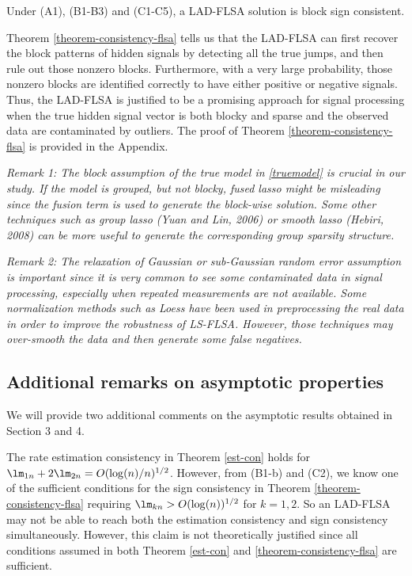 \documentclass[12pt]{article}
\begin{document}
\begin{theorem}\label{theorem-consistency-flsa}
Under (A1), (B1-B3) and (C1-C5), a LAD-FLSA solution is  block  sign consistent.
\end{theorem}
 Theorem \ref{theorem-consistency-flsa} tells us that
 the LAD-FLSA can first recover the block patterns of hidden signals  by detecting all the true jumps,
 and then rule out those nonzero blocks.
 Furthermore, with a very large probability, those nonzero blocks
 are identified correctly
  to have either positive or negative
 signals.
Thus, the LAD-FLSA is justified to be  a promising approach for signal processing
when the true hidden signal vector  is both blocky and sparse and the observed data are contaminated by outliers.
The proof of Theorem \ref{theorem-consistency-flsa} is
provided in the Appendix.


{\it Remark 1: The block assumption of the true model in \eqref{truemodel} is  crucial in our
study. If the model is grouped, but not blocky,  fused lasso might be misleading since the
 fusion term is used to generate the block-wise solution.
 Some other techniques such as group lasso (Yuan and Lin, 2006)
 or smooth lasso (Hebiri, 2008) can be more useful to generate the
 corresponding group sparsity structure.}


{\it Remark 2: The relaxation of Gaussian or sub-Gaussian random error assumption is
important since it is very common  to see some contaminated data in signal processing, especially when
repeated measurements are not available. Some normalization methods such as Loess have been used
in  preprocessing the real data in order to improve the robustness of LS-FLSA. However, those techniques may over-smooth the data and then generate some
false negatives.}

\subsection{Additional remarks on asymptotic properties}
We will provide two additional comments on the asymptotic results obtained in
Section 3 and 4.


The rate estimation consistency in Theorem \ref{est-con} holds
for $\lm_{1n}+2\lm_{2n}=O(\log (n)/n)^{1/2}$. However,
from (B1-b) and (C2), we know one of the sufficient conditions for the sign consistency in
 Theorem \ref{theorem-consistency-flsa} requiring  $\lm_{kn}>O(\log (n))^{1/2}$ for $k=1, 2$.
So an LAD-FLSA may not
be able to reach both the estimation consistency and sign consistency simultaneously.
However, this claim is not theoretically justified since
 all conditions assumed in both Theorem \ref{est-con}
and \ref{theorem-consistency-flsa} are sufficient.
\end{document}

